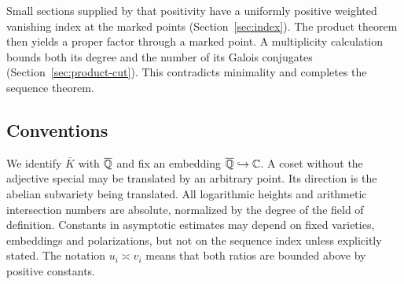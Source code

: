 Small sections supplied by that positivity have a uniformly positive
weighted vanishing index at the marked points
(Section~\ref{sec:index}). The product theorem then yields a proper
factor through a marked point. A multiplicity calculation bounds both
its degree and the number of its Galois conjugates
(Section~\ref{sec:product-cut}). This contradicts minimality and completes the sequence theorem.

\subsection{Conventions}
We identify $\bar K$ with $\overline{\mathbb Q}$ and fix an embedding $\overline{\mathbb Q}\hookrightarrow
\mathbb C$. A coset without the adjective special may be translated by
an arbitrary point. Its direction is the abelian subvariety being
translated. All logarithmic heights and arithmetic intersection numbers
are absolute, normalized by the degree of the field of definition.
Constants in asymptotic estimates may depend on fixed varieties,
embeddings and polarizations, but not on the sequence index unless
explicitly stated. The notation $u_i\asymp v_i$ means that both ratios
are bounded above by positive constants.
